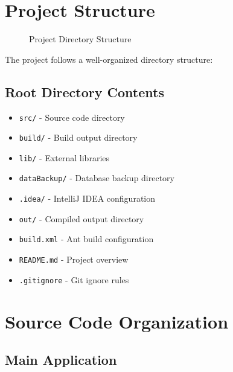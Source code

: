 \documentclass[12pt,a4paper]{article}
\begin{document}
\section{Project Structure}

\begin{figure}[h]
\centering
{}
\caption{Project Directory Structure}
\end{figure}

The project follows a well-organized directory structure:

\subsection{Root Directory Contents}
\begin{itemize}
    \item \texttt{src/} - Source code directory
    \item \texttt{build/} - Build output directory
    \item \texttt{lib/} - External libraries
    \item \texttt{dataBackup/} - Database backup directory
    \item \texttt{.idea/} - IntelliJ IDEA configuration
    \item \texttt{out/} - Compiled output directory
    \item \texttt{build.xml} - Ant build configuration
    \item \texttt{README.md} - Project overview
    \item \texttt{.gitignore} - Git ignore rules
\end{itemize}

\section{Source Code Organization}

\subsection{Main Application}
\end{document}
